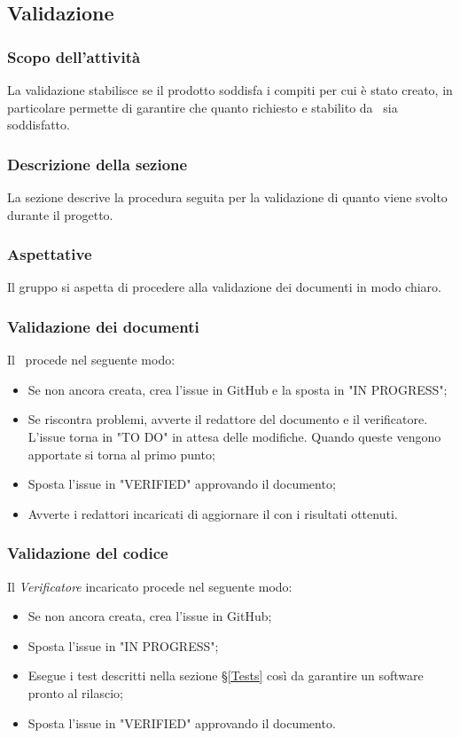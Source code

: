 \subsection{Validazione}\label{PSup_Validazione}
\subsubsection{Scopo dell'attività}\label{PSup_Validazione_Scopo}
La validazione stabilisce se il prodotto soddisfa i compiti per cui è stato creato, in particolare permette di garantire che quanto richiesto e stabilito da \Proponente\ sia soddisfatto.

\subsubsection{Descrizione della sezione} 
La sezione descrive la procedura seguita per la validazione di quanto viene svolto durante il progetto.

\subsubsection{Aspettative}
Il gruppo si aspetta di procedere alla validazione dei documenti in modo chiaro. 

\subsubsection{Validazione dei documenti}\label{ValidazioneDoc}
Il \Responsabile\ procede nel seguente modo:
\begin{itemize}
	\item Se non ancora creata, crea l'issue in GitHub e la sposta in "IN PROGRESS";
	\item Se riscontra problemi, avverte il redattore del documento e il verificatore. L'issue torna in "TO DO" in attesa delle modifiche. Quando queste vengono apportate si torna al primo punto;
	\item Sposta l'issue in "VERIFIED" approvando il documento;
	\item Avverte i redattori incaricati di aggiornare il \PdQv{} con i risultati ottenuti.
\end{itemize}

\subsubsection{Validazione del codice}\label{ValidazioneCodice}
Il \textit{Verificatore} incaricato procede nel seguente modo:
\begin{itemize}
	\item Se non ancora creata, crea l'issue in GitHub;
	\item Sposta l'issue in "IN PROGRESS";
	\item Esegue i test descritti nella sezione \S\ref{Tests} così da garantire un software pronto al rilascio;
	\item Sposta l'issue in "VERIFIED" approvando il documento.
\end{itemize}


